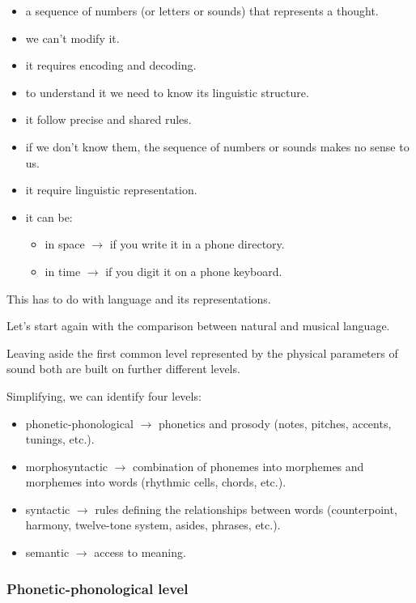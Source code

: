 \begin{itemize}
\tightlist\item a sequence of numbers (or letters or sounds) that represents a thought.
\item we can't modify it.
\item it requires encoding and decoding.
\item to understand it we need to know its linguistic structure.
\item it follow precise and shared rules.
\item if we don't know them, the sequence of numbers or sounds makes no sense to us.
\item it require linguistic representation.
\item it can be: 
  \begin{itemize}
  \tightlist\item in space \(\rightarrow\) if you write it in a phone directory.
  \item in time \(\rightarrow\) if you digit it on a phone keyboard.
  \end{itemize}
\end{itemize}

This has to do with language and its representations.

Let's start again with the comparison between natural and musical language.

Leaving aside the first common level represented by the physical parameters of sound both are built on further different levels.

Simplifying, we can identify four levels:

\begin{itemize}
\tightlist\item phonetic-phonological \(\rightarrow\) phonetics and prosody (notes, pitches, accents, tunings, etc.).
\item morphosyntactic \(\rightarrow\) combination of phonemes into morphemes and morphemes into words (rhythmic cells, chords, etc.).
\item syntactic \(\rightarrow\) rules defining the relationships between words (counterpoint, harmony, twelve-tone system, asides, phrases, etc.).
\item semantic \(\rightarrow\) access to meaning.
\end{itemize}

\subsubsection{Phonetic-phonological level }\label{phonetic-phonological-level}

